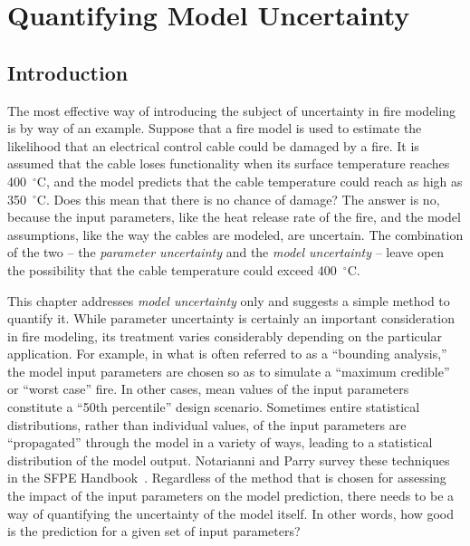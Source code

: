 
\newcommand{\paper}{chapter }

\chapter{Quantifying Model Uncertainty}

\section{Introduction}

The most effective way of introducing the subject of uncertainty in fire modeling is by way of an example.
Suppose that a fire model is used to estimate the likelihood that an electrical control cable could be damaged by
a fire. It is assumed that the cable loses functionality when its surface temperature reaches 400~$^\circ$C,
and the model predicts that the cable temperature could reach as high as 350~$^\circ$C.
Does this mean that there is no chance of damage? The answer is no, because the input parameters, like the heat release rate of
the fire, and the model assumptions, like the way the cables are modeled, are uncertain. The combination of the
two -- the {\em parameter uncertainty} and the {\em model uncertainty} -- leave open the possibility that the cable temperature could exceed
400~$^\circ$C.

This \paper addresses {\em model uncertainty} only and suggests a simple method to quantify it. While parameter uncertainty is certainly an
important consideration in fire modeling, its treatment varies considerably depending on the particular application. For example, in what is often
referred to as a ``bounding analysis,'' the model input parameters are chosen so as to simulate a ``maximum credible'' or ``worst case'' fire. In other cases,
mean values of the input parameters constitute a ``50th percentile'' design scenario.
Sometimes entire statistical distributions, rather than individual values, of the input parameters are ``propagated'' through the model in a variety of ways, leading to
a statistical distribution of the model output. Notarianni and Parry survey these techniques in the SFPE Handbook~\cite{Notarianni:SFPE}.
Regardless of the method that is chosen for assessing the impact of the input parameters on the model prediction, there needs to be a way of
quantifying the uncertainty of the model itself. In other words, how good is the prediction for a given set of input parameters?


